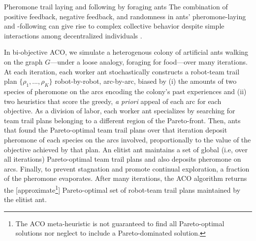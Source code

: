 \documentclass[fleqn,10pt,lineno]{wlpeerj}
\begin{document}
\begin{mybox}[label=box:ants, breakable]{Pheromone trail laying and following by foraging ants}
The combination of positive feedback, negative feedback, and randomness in ants' pheromone-laying and -following can give rise to complex collective behavior despite simple interactions among decentralized individuals \cite{bonabeau1997self,bonabeau1999swarm,goss1989self,jackson2006communication,edelstein1995trail,watmough1995modelling}.
\end{mybox}

In bi-objective ACO, we simulate a heterogenous colony of artificial ants walking on the graph $G$---under a loose analogy, foraging for food---over many iterations. 
At each iteration, each worker ant stochastically constructs a robot-team trail plan $\{\rho_1, ..., \rho_K\}$ robot-by-robot, arc-by-arc, biased by (i) the amounts of two species of pheromone on the arcs encoding the colony's past experiences and (ii) two heuristics that score the greedy, \emph{a priori} appeal of each arc for each objective. 
As a division of labor, each worker ant specializes by searching for team trail plans belonging to a different region of the Pareto-front.
Then, ants that found the Pareto-optimal team trail plans over that iteration deposit pheromone of each species on the arcs involved, proportionally to the value of the objective achieved by that plan.
An elitist ant \cite{dorigo1996ant} maintains a set of global (i.e, over all iterations) Pareto-optimal team trail plans and also deposits pheromone on arcs.
Finally, to prevent stagnation and promote continual exploration, a fraction of the pheromone evaporates. After many iterations, the ACO algorithm returns the [approximate\footnote{The ACO meta-heuristic is not guaranteed to find all Pareto-optimal solutions nor neglect to include a Pareto-dominated solution.}] Pareto-optimal set of robot-team trail plans maintained by the elitist ant. 
\end{document}
